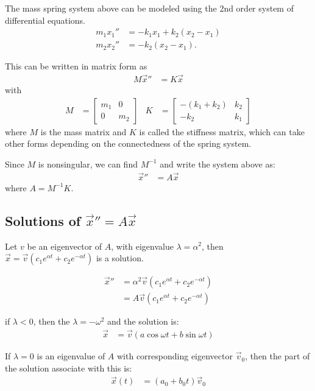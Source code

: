 The mass spring system above can be modeled using the 2nd order system of differential equations.  
\begin{align*}
m_1 x_1 '' & = - k_1 x_1 + k_2 (x_2-x_1) \\
m_2 x_2 '' & = - k_2 (x_2-x_1) .
\end{align*}

This can be written in matrix form as 
%
\begin{align*}
M \vec{x}'' & = K\vec{x} 
\end{align*}
with 
\begin{align*}
M & = \begin{bmatrix}
m_1 & 0 \\ 0 & m_2 
\end{bmatrix}
&
K & =\begin{bmatrix}
-(k_1+k_2) & k_2 \\ -k_2 & k_1 
\end{bmatrix}
\end{align*}
where $M$ is the mass matrix and $K$ is called the stiffness matrix, which can take other forms depending on the connectedness of the spring system. 

Since $M$ is nonsingular, we can find $M^{-1}$ and write the system above as:
%
\begin{align*}
\vec{x}'' & = A \vec{x}
\end{align*}
%
where $A = M^{-1} K$. 


\subsection{Solutions of $\vec{x}'' = A\vec{x}$}

Let $v$ be an eigenvector of $A$, with eigenvalue $\lambda = \alpha^2$, then $\vec{x} =\vec{v}(c_1e^{\alpha t} + c_2 e^{-\alpha t})$ is a solution.  

\begin{align*}
\vec{x}'' & = \alpha^2 \vec{v} (c_1 e^{\alpha t}+ c_2 e^{-\alpha t}) \\
& = A \vec{v}(c_1e^{\alpha t} + c_2 e^{-\alpha t})
\end{align*}

if $\lambda <0$, then the $\lambda = - \omega^2$ and the solution is:
%
\begin{align*}
\vec{x} & = \vec{v} (a \cos \omega t + b \sin \omega t) 
\end{align*}

If $\lambda = 0$ is an eigenvalue of $A$ with corresponding eigenvector $\vec{v}_0$, then the part of the solution associate with this is:
%
\begin{align*}
\vec{x}(t) & = (a_0 + b_0 t) \vec{v}_0
\end{align*}

